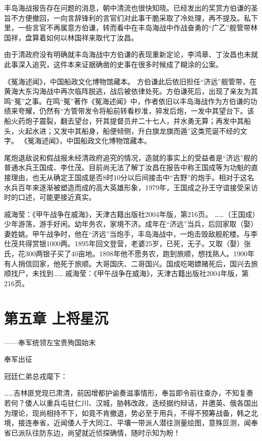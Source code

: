 \documentclass[12pt,UTF8]{ctexbook}
\begin{document}
丰岛海战报告存在问题的消息，朝中清流也很快知晓。已经发出的奖赏方伯谦的圣旨不方便撤回，一向言辞锋利的言官们对此事干脆采取了冷处理，再不提及。私下里，一些言官不再属意方伯谦，转而看中在丰岛海战中作战奋勇的“广乙”舰管带林国祥，盘算着如何以林国祥来取代丁汝昌。

由于清政府没有明确就丰岛海战中方伯谦的表现重新定论，李鸿章、丁汝昌也未就此事深入追究，这件本来证据确凿的史事在很多时候成了糊涂的公案。

《冤海述闻》，中国船政文化博物馆藏本。
方伯谦此后依旧担任“济远”舰管带，在黄海大东沟海战中再次临阵脱逃，战后被依律处死。方伯谦死后，出现了亲友为其鸣“冤”之事。在鸣“冤”著作《冤海述闻》中，作者依旧以丰岛海战作为方伯谦的功绩来夸耀，仍然有“方管带发令将船前转看杪准，猝发后炮，一发中其望台下。该船火药炮子震裂，翻去望台，歼其提督员弁二十七人，并水勇无算；再发中其船头，火起水进；又发中其船身，船便倾侧，升白旗龙旗而遁”这类荒诞不经的文字。 《冤海述闻》，中国船政文化博物馆藏本。

尾炮退敌说和假战报未经清政府追究的情况，造就的事实上的受益者是“济远”舰的普通水兵王国成、李仕茂。目前尚无法了解丁汝昌在报告中称王国成等为功魁的直接理由，也无从确定王国成是否8时10分以后间接击中“吉野”的炮手。相对于这名水兵百年来逐渐被塑造而成的高大英雄形象，1979年，王国成之孙王守谊接受采访时的口述，可能更接近真实。

戚海莹：《甲午战争在威海》，天津古籍出版社2004年版，第216页。
……（王国成）少年游荡，游手好闲。幼年务农，家境不济。成年在“济远”当兵，后回家取（娶）妻姓姚。甲午战争时，他在“济远”当炮手，丰岛海战中，一炮击毁敌舰舵楼。与李仕茂共得赏银1000两。1895年回文登营，老婆25岁，已死，无子。又取（娶）张氏，花300两银子买了40亩地。1898年他不愿务农，跑到旅顺，想找熟人。1900年有人捎信回家，他死于旅顺。大哥国庆、二哥国兴。国成吃喝嫖赌死后，国兴去旅顺找尸，未找到…… 戚海莹：《甲午战争在威海》，天津古籍出版社2004年版，第216页。

\chapter{第五章 上将星沉}

——奉军统领左宝贵殉国始末

奉军出征

冠廷仁弟总戎麾下：

……吉林匪党现已肃清，前因增都护谕奏滋事情形，奉旨即令前往查办，不知复奏若何？倭人以重兵屯驻仁川、汉城，胁韩改政，迭经据约辩诘，并邀英、俄各国出为理论，现尚相持不下，如竟不肯撤退，势必至于用兵，不得不预筹战备，韩之北境，接连奉省，近闻倭人于大同江、平壤一带派人潜往测量绘图，意殊叵测，闻奉省已派队往防东边，尚望就近侦探确情，随时示知为盼！
\end{document}
